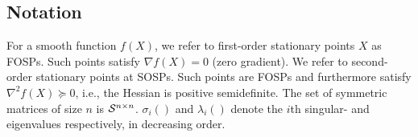 \subsection*{Notation}

For a smooth function $f(X)$, we refer to first-order stationary points $X$ as FOSPs. Such points satisfy $\nabla f(X) = 0$ (zero gradient). We refer to second-order stationary points at SOSPs. Such points are FOSPs and furthermore satisfy $\nabla^2 f(X) \succeq 0$, i.e., the Hessian is positive semidefinite. The set of symmetric matrices of size $n$ is $\mathcal{S}^{n\times n}$. $\sigma_i()$  and $\lambda_i()$ denote the $i$th singular- and eigenvalues respectively, in decreasing order.
